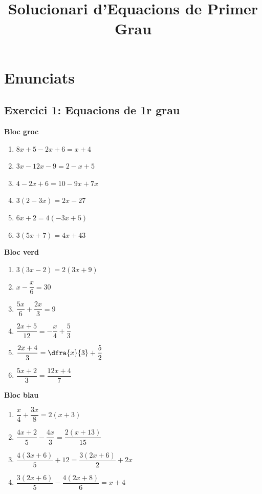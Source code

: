 \documentclass[11pt,a4paper]{article}
\title{\textbf{Solucionari d'Equacions de Primer Grau}}
\author{}
\date{}
\begin{document}
\maketitle

\section*{Enunciats}
\subsection*{Exercici 1: Equacions de 1r grau}

\begin{blocgroc}
\textbf{Bloc groc}
\begin{enumerate}[label=\alph*), start=1]
\item $8x + 5 - 2x + 6 = x + 4$
\item $3x - 12x - 9 = 2 - x + 5$
\item $4 - 2x + 6 = 10 - 9x + 7x$
\item $3(2 - 3x) = 2x - 27$
\item $6x + 2 = 4(-3x + 5)$
\item $3(5x + 7) = 4x + 43$
\end{enumerate}
\end{blocgroc}

\begin{blocverd}
\textbf{Bloc verd}
\begin{enumerate}[label=\alph*), start=7]
\item $3(3x - 2) = 2(3x + 9)$
\item $x - \dfrac{x}{6} = 30$
\item $\dfrac{5x}{6} + \dfrac{2x}{3} = 9$
\item $\dfrac{2x + 5}{12} = -\dfrac{x}{4} + \dfrac{5}{3}$
\item $\dfrac{2x + 4}{3} = \dfra{x}{3} + \dfrac{5}{2}$
\item $\dfrac{5x + 2}{3} = \dfrac{12x + 4}{7}$
\end{enumerate}
\end{blocverd}

\begin{blocblau}
\textbf{Bloc blau}
\begin{enumerate}[label=\alph*), start=13]
\item $\dfrac{x}{4} + \dfrac{3x}{8} = 2(x + 3)$
\item $\dfrac{4x + 2}{5} - \dfrac{4x}{3} = \dfrac{2(x + 13)}{15}$
\item $\dfrac{4(3x + 6)}{5} + 12 = \dfrac{3(2x + 6)}{2} + 2x$
\item $\dfrac{3(2x + 6)}{5} - \dfrac{4(2x + 8)}{6} = x + 4$
\end{enumerate}
\end{blocblau}
\end{document}

